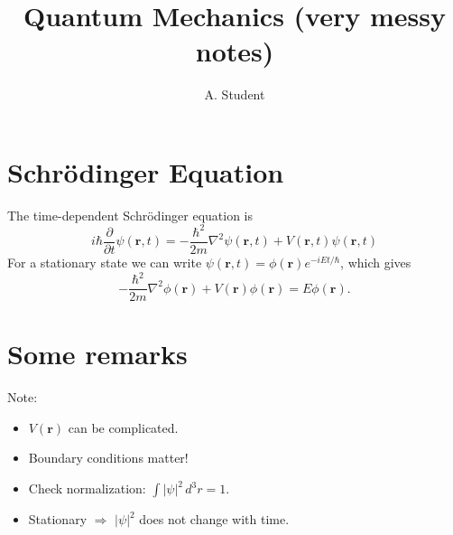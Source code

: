 \documentclass{article}
\title{Quantum Mechanics (very messy notes)}
\author{A. Student}
\date{}
\begin{document}
\maketitle

\section{Schr\"odinger Equation}
The time-dependent Schr\"odinger equation is
\begin{equation}
  i\hbar \frac{\partial}{\partial t}\psi(\mathbf{r},t)
  = -\frac{\hbar^2}{2m}\nabla^2\psi(\mathbf{r},t) + V(\mathbf{r},t)\psi(\mathbf{r},t)
\end{equation}
For a stationary state we can write $\psi(\mathbf{r},t) = \phi(\mathbf{r})e^{-iEt/\hbar}$,
which gives
\begin{equation}
  -\frac{\hbar^2}{2m}\nabla^2\phi(\mathbf{r}) + V(\mathbf{r})\phi(\mathbf{r}) = E\phi(\mathbf{r}).
\end{equation}

\section{Some remarks}
Note:
\begin{itemize}
  \item $V(\mathbf{r})$ can be complicated.
  \item Boundary conditions matter!
  \item Check normalization: $\int |\psi|^2 \, d^3r = 1$.
  \item Stationary $\Rightarrow$ $|\psi|^2$ does not change with time.
\end{itemize}
\end{document}
